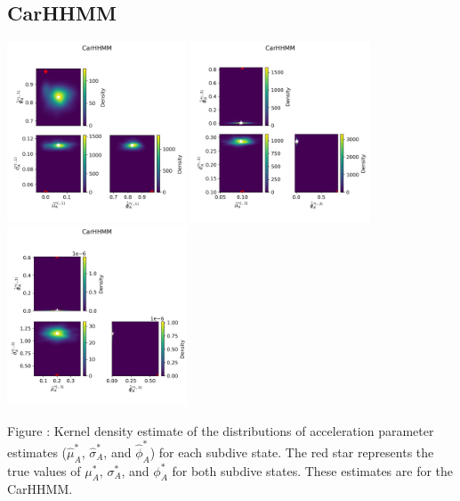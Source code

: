 \documentclass{article}
\begin{document}
        \subsection{CarHHMM}
        \begin{center}
        \includegraphics[width=2.1in]{../Plots/hhmm_V_MLE_density_A_0_0.png}
        \includegraphics[width=2.1in]{../Plots/hhmm_V_MLE_density_A_0_1.png}
        \includegraphics[width=2.1in]{../Plots/hhmm_V_MLE_density_A_0_2.png}
        \end{center}
        
        \noindent Figure : Kernel density estimate of the distributions of acceleration parameter estimates ($\hat \mu^*_A$, $\hat \sigma^*_A$, and $\hat \phi^*_A$) for each subdive state. The red star represents the true values of $\mu^*_A$, $\sigma^*_A$, and $\phi^*_A$ for both subdive states. These estimates are for the CarHHMM. 
        \addtocounter{fignum}{1}
        
\end{document}
